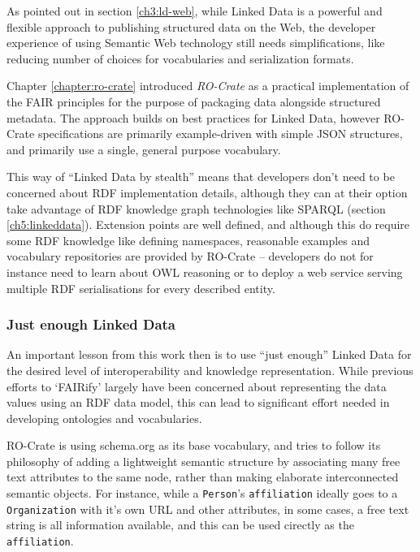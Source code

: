 As pointed out in section \vref{ch3:ld-web}, while Linked Data is a powerful and flexible approach to publishing structured data on the Web, the developer experience of using Semantic Web technology still needs simplifications, like reducing number of choices for vocabularies and serialization formats. 

Chapter \vref{chapter:ro-crate} introduced \emph{RO-Crate} as a practical implementation of the FAIR principles for the purpose of packaging data alongside structured metadata.
The approach builds on best practices for Linked Data, however RO-Crate specifications are primarily example-driven with simple JSON structures, and primarily use a single, general purpose vocabulary. 

This way of ``Linked Data by stealth'' means that developers don't need to be concerned about RDF implementation details, although they can at their option take advantage of RDF knowledge graph technologies like SPARQL (section \vref{ch5:linkeddata}).
Extension points are well defined, and although this do require some RDF knowledge like defining namespaces, reasonable examples and vocabulary repositories are provided by RO-Crate --  developers do not for instance need to learn about OWL reasoning or to deploy a web service serving multiple RDF serialisations for every described entity.



\subsubsection{Just enough Linked Data}

An important lesson from this work then is to use ``just enough'' Linked Data for the desired level of interoperability and knowledge representation.
While previous efforts to `FAIRify' largely have been concerned about representing the data values using an RDF data model, this can lead to significant effort needed in developing ontologies and vocabularies. 

RO-Crate is using schema.org \cite{schema.org} as its base vocabulary, and tries to follow its philosophy of adding a lightweight semantic structure by associating many free text attributes to the same node, rather than making elaborate interconnected semantic objects.
For instance, while a \texttt{Person}'s \texttt{affiliation} ideally goes to a \texttt{Organization} with it's own URL and other attributes, in some cases, a free text string is all information available, and this can be used cirectly as the \texttt{affiliation}. 

